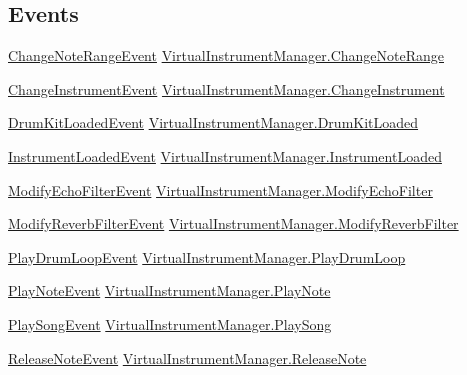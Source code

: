 \subsection*{Events}
\begin{DoxyCompactItemize}
\item 
\hyperlink{class_virtual_instrument_manager_1_1_change_note_range_event}{Change\+Note\+Range\+Event} \hyperlink{group___virtual_instrument_manager_event_types_gab6fa99d08e8466406835b9fc4ff859f1}{Virtual\+Instrument\+Manager.\+Change\+Note\+Range}
\item 
\hyperlink{class_virtual_instrument_manager_1_1_change_instrument_event}{Change\+Instrument\+Event} \hyperlink{group___virtual_instrument_manager_event_types_ga1b9f12a73a5418ea5695d38b78c506c4}{Virtual\+Instrument\+Manager.\+Change\+Instrument}
\item 
\hyperlink{class_virtual_instrument_manager_1_1_drum_kit_loaded_event}{Drum\+Kit\+Loaded\+Event} \hyperlink{group___virtual_instrument_manager_event_types_ga2dea060b2fba524166433300113dc281}{Virtual\+Instrument\+Manager.\+Drum\+Kit\+Loaded}
\item 
\hyperlink{class_virtual_instrument_manager_1_1_instrument_loaded_event}{Instrument\+Loaded\+Event} \hyperlink{group___virtual_instrument_manager_event_types_gad79b789b020d7e4a8c149ec653c0b97f}{Virtual\+Instrument\+Manager.\+Instrument\+Loaded}
\item 
\hyperlink{class_virtual_instrument_manager_1_1_modify_echo_filter_event}{Modify\+Echo\+Filter\+Event} \hyperlink{group___virtual_instrument_manager_event_types_ga112ed15f48fd261f1ad71c3c953c0a58}{Virtual\+Instrument\+Manager.\+Modify\+Echo\+Filter}
\item 
\hyperlink{class_virtual_instrument_manager_1_1_modify_reverb_filter_event}{Modify\+Reverb\+Filter\+Event} \hyperlink{group___virtual_instrument_manager_event_types_gaadd137e073cb3849f610a46e0d032858}{Virtual\+Instrument\+Manager.\+Modify\+Reverb\+Filter}
\item 
\hyperlink{class_virtual_instrument_manager_1_1_play_drum_loop_event}{Play\+Drum\+Loop\+Event} \hyperlink{group___virtual_instrument_manager_event_types_ga5657ff4bcc7de6d240d7092ffd22a6fe}{Virtual\+Instrument\+Manager.\+Play\+Drum\+Loop}
\item 
\hyperlink{class_virtual_instrument_manager_1_1_play_note_event}{Play\+Note\+Event} \hyperlink{group___virtual_instrument_manager_event_types_gaa21021c13a8c9d13cbf374d5bf9d68fa}{Virtual\+Instrument\+Manager.\+Play\+Note}
\item 
\hyperlink{class_virtual_instrument_manager_1_1_play_song_event}{Play\+Song\+Event} \hyperlink{group___virtual_instrument_manager_event_types_gae450bdba9c513ab4e43f69def50fa84d}{Virtual\+Instrument\+Manager.\+Play\+Song}
\item 
\hyperlink{class_virtual_instrument_manager_1_1_release_note_event}{Release\+Note\+Event} \hyperlink{group___virtual_instrument_manager_event_types_ga3a1726a6366126421434c2c7be5e5678}{Virtual\+Instrument\+Manager.\+Release\+Note}
\end{DoxyCompactItemize}
